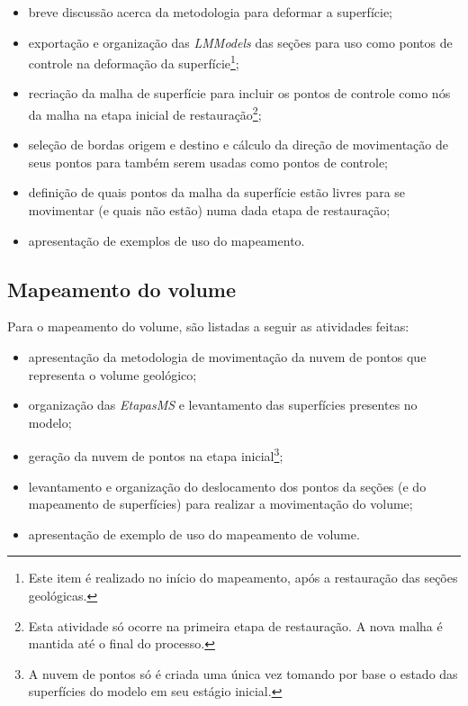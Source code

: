 \renewcommand{\labelitemi}{•}
\begin{itemize}
  \item breve discussão acerca da metodologia para deformar a superfície;
  \item exportação e organização das \emph{LMModels} das seções para uso como pontos de controle na deformação da superfície\footnote{Este item é realizado no início do mapeamento, após a restauração das seções geológicas.};
  \item recriação da malha de superfície para incluir os pontos de controle como nós da malha na etapa inicial de restauração\footnote{Esta atividade só ocorre na primeira etapa de restauração. A nova malha é mantida até o final do processo.};
  \item seleção de bordas origem e destino e cálculo da direção de movimentação de seus pontos para também serem usadas como pontos de controle;
  \item definição de quais pontos da malha da superfície estão livres para se movimentar (e quais não estão) numa dada etapa de restauração;
  \item apresentação de exemplos de uso do mapeamento.
\end{itemize}

\subsection*{Mapeamento do volume}

Para o mapeamento do volume, são listadas a seguir as atividades feitas:

\renewcommand{\labelitemi}{•}
\begin{itemize}
  \item apresentação da metodologia de movimentação da nuvem de pontos que representa o volume geológico;
  \item organização das \emph{EtapasMS} e levantamento das superfícies presentes no modelo;
  \item geração da nuvem de pontos na etapa inicial\footnote{A nuvem de pontos só é criada uma única vez tomando por base o estado das superfícies do modelo em seu estágio inicial.};
  \item levantamento e organização do deslocamento dos pontos da seções (e do mapeamento de superfícies) para realizar a movimentação do volume;
  \item apresentação de exemplo de uso do mapeamento de volume.
\end{itemize}

